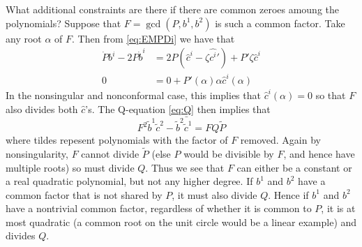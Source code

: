 What additional constraints are there if there are common zeroes amoung the polynomials? Suppose that $F = \gcd(P,b^1,b^2)$ is such a common factor. Take any root $α$ of $F$. Then from \eqref{eq:EMPDi} we have that
\begin{align}
\dot P b^i - 2P\dot b^i &= 2P\left( \hat c^i - \zeta\hat {c^i}'\right) + P'\zeta\hat c^i \\
0 &= 0 + P'(α)α\hat c^i(α)
\end{align}
In the nonsingular and nonconformal case, this implies that $\hat c^i(α) = 0$ so that $F$ also divides both $\hat c$'s. The Q-equation \eqref{eq:Q} then implies that
\[
F^2 \bar{\tilde{b}^1\tilde{c}^2 - \tilde{b}^2\tilde{c}^1 = F Q \tilde{P}}
\]
where tildes repesent polynomials with the factor of $F$ removed. Again by nonsingularity, $F$ cannot divide $\tilde{P}$ (else $P$ would be divisible by $F$, and hence have multiple roots) so must divide $Q$. Thus we see that $F$ can either be a constant or a real quadratic polynomial, but not any higher degree. If $b^1$ and $b^2$ have a common factor that is not shared by $P$, it must also divide $Q$. Hence if $b^1$ and $b^2$ have a nontrivial common factor, regardless of whether it is common to $P$, it is at most quadratic (a common root on the unit circle would be a linear example) and divides $Q$.














